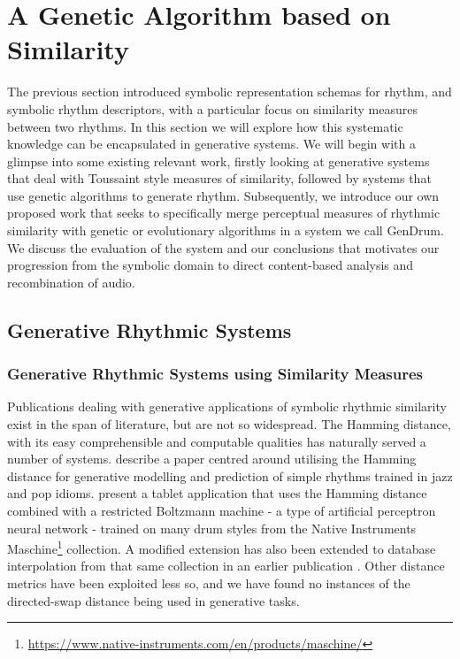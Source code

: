 \section{A Genetic Algorithm based on Similarity}

The previous section introduced symbolic representation schemas for rhythm, and symbolic rhythm descriptors, with a particular focus on similarity measures between two rhythms. In this section we will explore how this systematic knowledge can be encapsulated in generative systems. We will begin with a glimpse into some existing relevant work, firstly looking at generative systems that deal with Toussaint style measures of similarity, followed by systems that use genetic algorithms to generate rhythm. Subsequently, we introduce our own proposed work that seeks to specifically merge perceptual measures of rhythmic similarity with genetic or evolutionary algorithms in a system we call GenDrum. We discuss the evaluation of the system and our conclusions that motivates our progression from the symbolic domain to direct content-based analysis and recombination of audio.

\subsection{Generative Rhythmic Systems}

\subsubsection{Generative Rhythmic Systems using Similarity Measures}

Publications dealing with generative applications of symbolic rhythmic similarity exist in the span of literature, but are not so widespread. The Hamming distance, with its easy comprehensible and computable qualities has naturally served a number of systems. \cite{Paiement2007} describe a paper centred around utilising the Hamming distance for generative modelling and prediction of simple rhythms trained in jazz and pop idioms. \cite{Vogl2017} present a tablet application that uses the Hamming distance combined with a restricted Boltzmann machine - a type of artificial perceptron neural network - trained on many drum styles from the Native Instruments Maschine\footnote{\url{https://www.native-instruments.com/en/products/maschine/}} collection. A modified extension has also been extended to database interpolation from that same collection in an earlier  publication \citep{Vogl2016}. Other distance metrics have been exploited less so, and we have found no instances of the directed-swap distance being used in generative tasks.

